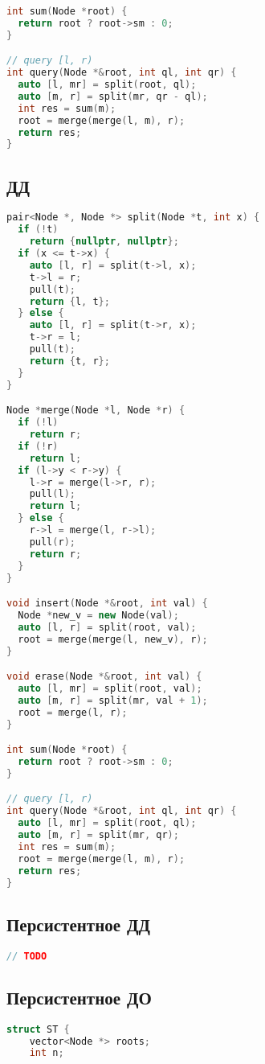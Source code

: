 \documentclass[10pt,a4paper,landscape,twosided]{extarticle}
\begin{document}
\begin{multicols*}{3}
\begin{lstlisting}[language=C++]
int sum(Node *root) {
  return root ? root->sm : 0;
}

// query [l, r)
int query(Node *&root, int ql, int qr) {
  auto [l, mr] = split(root, ql);
  auto [m, r] = split(mr, qr - ql);
  int res = sum(m);
  root = merge(merge(l, m), r);
  return res;
}
\end{lstlisting}

\subsection{ДД}
\begin{lstlisting}[language=C++]
pair<Node *, Node *> split(Node *t, int x) {
  if (!t)
    return {nullptr, nullptr};
  if (x <= t->x) {
    auto [l, r] = split(t->l, x);
    t->l = r;
    pull(t);
    return {l, t};
  } else {
    auto [l, r] = split(t->r, x);
    t->r = l;
    pull(t);
    return {t, r};
  }
}

Node *merge(Node *l, Node *r) {
  if (!l)
    return r;
  if (!r)
    return l;
  if (l->y < r->y) {
    l->r = merge(l->r, r);
    pull(l);
    return l;
  } else {
    r->l = merge(l, r->l);
    pull(r);
    return r;
  }
}

void insert(Node *&root, int val) {
  Node *new_v = new Node(val);
  auto [l, r] = split(root, val);
  root = merge(merge(l, new_v), r);
}

void erase(Node *&root, int val) {
  auto [l, mr] = split(root, val);
  auto [m, r] = split(mr, val + 1);
  root = merge(l, r);
}

int sum(Node *root) {
  return root ? root->sm : 0;
}

// query [l, r)
int query(Node *&root, int ql, int qr) {
  auto [l, mr] = split(root, ql);
  auto [m, r] = split(mr, qr);
  int res = sum(m);
  root = merge(merge(l, m), r);
  return res;
}
\end{lstlisting}

\subsection{Персистентное ДД}
\begin{lstlisting}[language=C++]
// TODO

\end{lstlisting}

\subsection{Персистентное ДО}
\begin{lstlisting}[language=C++]
struct ST {
    vector<Node *> roots;
    int n;


\end{lstlisting}
\end{multicols*}
\end{document}
